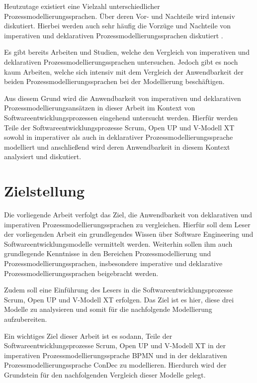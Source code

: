 Heutzutage existiert eine Vielzahl unterschiedlicher Prozessmodellierungssprachen. Über deren Vor- und Nachteile wird intensiv diskutiert. Hierbei werden auch sehr häufig die Vorzüge und Nachteile von imperativen und deklarativen Prozessmodellierungssprachen diskutiert \cite{fahland2010}. \newline

Es gibt bereits Arbeiten und Studien, welche den Vergleich von imperativen und deklarativen Prozessmodellierungssprachen untersuchen. Jedoch gibt es noch kaum Arbeiten, welche sich intensiv mit dem Vergleich der Anwendbarkeit der beiden Prozessmodellierungssprachen bei der Modellierung beschäftigen.\newline

Aus diesem Grund wird die Anwendbarkeit von imperativen und deklarativen Prozessmodellierungsansätzen in dieser Arbeit im Kontext von Softwareentwicklungsprozessen eingehend untersucht werden. Hierfür werden Teile der Softwareentwicklungsprozesse Scrum, Open UP und V-Modell XT sowohl in imperativer als auch in deklarativer Prozessmodellierungssprache modelliert und anschließend wird deren Anwendbarkeit in diesem Kontext analysiert und diskutiert.\newline



\section{Zielstellung}
Die vorliegende Arbeit verfolgt das Ziel, die Anwendbarkeit von deklarativen und imperativen Prozessmodellierungssprachen zu vergleichen. Hierfür soll dem Leser der vorliegenden Arbeit ein grundlegendes Wissen über Software Engineering und Softwareentwicklungsmodelle vermittelt werden. Weiterhin sollen ihm auch grundlegende Kenntnisse in den Bereichen Prozessmodellierung und Prozessmodellierungssprachen, insbesondere imperative und deklarative Prozessmodellierungssprachen beigebracht werden. \newline

Zudem soll eine Einführung des Lesers in die Softwareentwicklungsprozesse Scrum, Open UP und V-Modell XT erfolgen. Das Ziel ist es hier, diese drei Modelle zu analysieren und somit für die nachfolgende Modellierung aufzubereiten.\newline

Ein wichtiges Ziel dieser Arbeit ist es sodann, Teile der Softwareentwicklungsprozesse Scrum, Open UP und V-Modell XT in der imperativen Prozessmodellierungssprache BPMN und in der deklarativen Prozessmodellierungssprache ConDec zu modellieren. Hierdurch wird der Grundstein für den nachfolgenden Vergleich dieser Modelle gelegt.\newline


